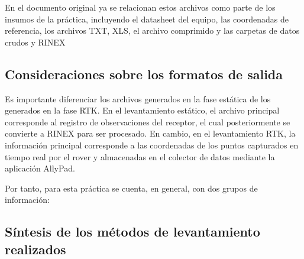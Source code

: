\documentclass[
  letterpaper,
  DIV=11,
  numbers=noendperiod]{scrartcl}
\begin{document}
En el documento original ya se relacionan estos archivos como parte de
los insumos de la práctica, incluyendo el datasheet del equipo, las
coordenadas de referencia, los archivos TXT, XLS, el archivo comprimido
y las carpetas de datos crudos y RINEX

\subsection{Consideraciones sobre los formatos de
salida}\label{consideraciones-sobre-los-formatos-de-salida}

Es importante diferenciar los archivos generados en la fase estática de
los generados en la fase RTK. En el levantamiento estático, el archivo
principal corresponde al registro de observaciones del receptor, el cual
posteriormente se convierte a RINEX para ser procesado. En cambio, en el
levantamiento RTK, la información principal corresponde a las
coordenadas de los puntos capturados en tiempo real por el rover y
almacenadas en el colector de datos mediante la aplicación AllyPad.

Por tanto, para esta práctica se cuenta, en general, con dos grupos de
información:

\subsection{Síntesis de los métodos de levantamiento
realizados}\label{suxedntesis-de-los-muxe9todos-de-levantamiento-realizados}
\end{document}
